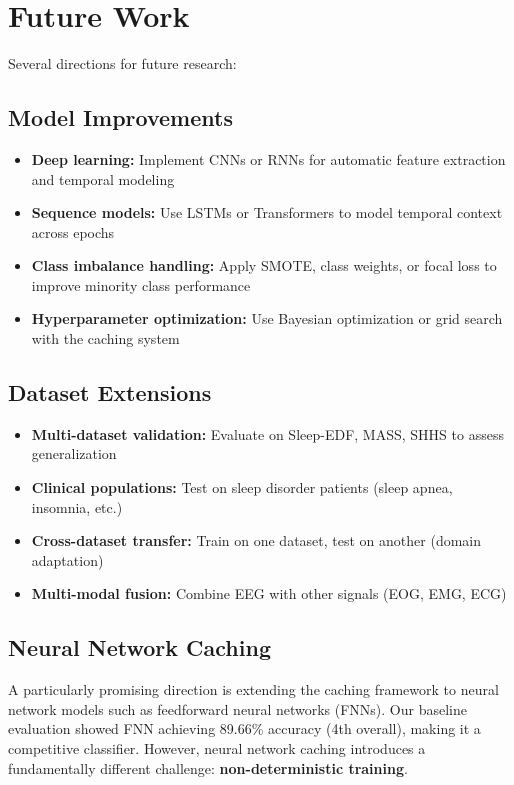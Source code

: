 \section{Future Work}
\label{sec:future_work}

Several directions for future research:

\subsection{Model Improvements}
\label{subsec:future_models}

\begin{itemize}
    \item \textbf{Deep learning:} Implement CNNs or RNNs for automatic feature extraction and temporal modeling
    \item \textbf{Sequence models:} Use LSTMs or Transformers to model temporal context across epochs
    \item \textbf{Class imbalance handling:} Apply SMOTE, class weights, or focal loss to improve minority class performance
    \item \textbf{Hyperparameter optimization:} Use Bayesian optimization or grid search with the caching system
\end{itemize}

\subsection{Dataset Extensions}
\label{subsec:future_datasets}

\begin{itemize}
    \item \textbf{Multi-dataset validation:} Evaluate on Sleep-EDF, MASS, SHHS to assess generalization
    \item \textbf{Clinical populations:} Test on sleep disorder patients (sleep apnea, insomnia, etc.)
    \item \textbf{Cross-dataset transfer:} Train on one dataset, test on another (domain adaptation)
    \item \textbf{Multi-modal fusion:} Combine EEG with other signals (EOG, EMG, ECG)
\end{itemize}

\subsection{Neural Network Caching}
\label{subsec:future_fnn_caching}

A particularly promising direction is extending the caching framework to neural network models such as feedforward neural networks (FNNs). Our baseline evaluation showed FNN achieving 89.66\% accuracy (4th overall), making it a competitive classifier. However, neural network caching introduces a fundamentally different challenge: \textbf{non-deterministic training}.

